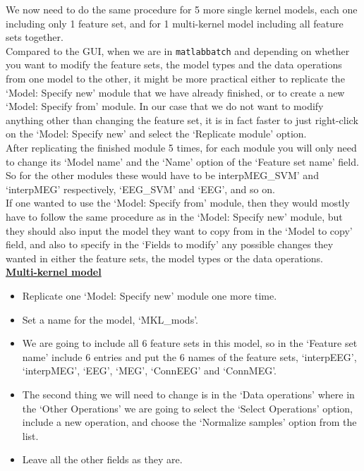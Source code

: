 \noindent We now need to do the same procedure for 5 more single kernel models, each one including only 1 feature set, and for 1 multi-kernel model including all feature sets together.
\\

Compared to the GUI, when we are in {\tt matlabbatch} and depending on whether you want to modify the feature sets, the model types and the data operations from one model to the other, it might be more practical either to replicate the `Model: Specify new' module that we have already finished, or to create a new `Model: Specify from' module. In our case that we do not want to modify anything other than changing the feature set, it is in fact faster to just right-click on the `Model: Specify new' and select the `Replicate module' option.
\\

After replicating the finished module 5 times, for each module you will only need to change its `Model name' and the `Name' option of the `Feature set name' field. So for the other modules these would have to be interpMEG\_SVM' and `interpMEG' respectively, `EEG\_SVM' and `EEG', and so on.
\\

If one wanted to use the `Model: Specify from' module, then they would mostly have to follow the same procedure as in the `Model: Specify new' module, but they should also input the model they want to copy from in the `Model to copy' field, and also to specify in the `Fields to modify' any possible changes they wanted in either the feature sets, the model types or the data operations.
\\[3cm]

\noindent \textbf{\underline{Multi-kernel model}}

\begin{itemize}
    
    \item Replicate one `Model: Specify new' module one more time.
    
    \item Set a name for the model, `MKL\_mods'.
    
    \item We are going to include all 6 feature sets in this model, so in the `Feature set name' include 6 entries and put the 6 names of the feature sets, `interpEEG', `interpMEG', `EEG', `MEG', `ConnEEG' and `ConnMEG'.
    
    \item The second thing we will need to change is in the `Data operations' where in the `Other Operations' we are going to select the `Select Operations' option, include a new operation, and choose the `Normalize samples' option from the list.
    
    \item Leave all the other fields as they are.
    
\end{itemize}


